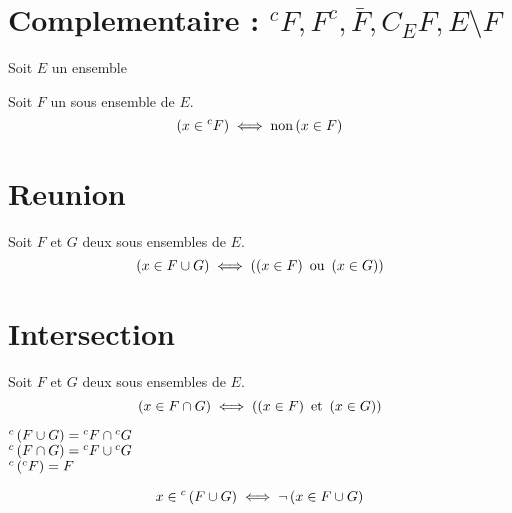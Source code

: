 \documentclass[12pt,twoside,a4paper]{article}
\author{MPSI 2}
\begin{document}
	\maketitle
	\section{Complementaire : ${^cF},F^c,\bar{F},C_EF,E\setminus F$}
		Soit $E$ un ensemble
		\begin{defi}
			Soit $F$ un sous ensemble de $E$.\\
			$$\left(x\in{^cF}\right)\iff\text{non}\left(x\in F\right)$$
		\end{defi}
	\section{Reunion}
		\begin{defi}
			Soit $F$ et $G$ deux sous ensembles de $E$.
			$$\left(x\in F\cup G\right)\iff\left(\left(x\in F\right)\text{ ou }\left(x\in G\right)\right)$$
		\end{defi}
	\section{Intersection}
		\begin{defi}
			Soit $F$ et $G$ deux sous ensembles de $E$.
			$$\left(x\in F\cap G\right)\iff\left(\left(x\in F\right)\text{ et }\left(x\in G\right)\right)$$
		\end{defi}
		\begin{prop}
			${^c\left(F\cup G\right)}={^cF}\cap{^cG}$ \\
			${^c\left(F\cap G\right)}={^cF}\cup{^cG}$ \\
			${^c\left(^cF\right)}=F$
		\end{prop}
		\begin{preuve}
			$$\begin{aligned}
				x\in{^c\left(F\cup G\right)}&\iff\neg\left(x\in F\cup G\right) \\
									&
			\end{aligned}$$
		\end{preuve}
\end{document}
